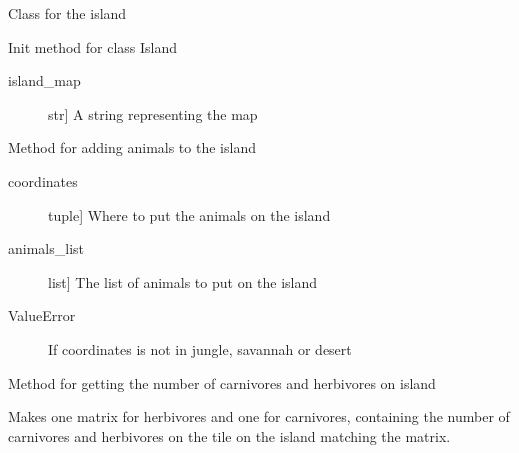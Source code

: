 \documentclass[a4paper,10pt,english]{sphinxmanual}
\begin{document}
\begin{fulllineitems}
\label{\detokenize{island:biosim.island.Island}}
Class for the island

Init method for class Island
\begin{description}
\item[{island\_map}] \leavevmode{[}str{]}
A string representing the map

\end{description}

\begin{fulllineitems}
\label{\detokenize{island:biosim.island.Island.add_animal_island}}
Method for adding animals to the island
\begin{description}
\item[{coordinates}] \leavevmode{[}tuple{]}
Where to put the animals on the island

\item[{animals\_list}] \leavevmode{[}list{]}
The list of animals to put on the island

\end{description}
\begin{description}
\item[{ValueError}] \leavevmode
If coordinates is not in jungle, savannah or desert

\end{description}

\end{fulllineitems}


\begin{fulllineitems}
\label{\detokenize{island:biosim.island.Island.animals_on_island}}
Method for getting the number of carnivores and herbivores on island

Makes one matrix for herbivores and one for carnivores, containing
the number of carnivores and herbivores on the tile on the island
matching the matrix.

\end{fulllineitems}



\end{fulllineitems}
\end{document}
